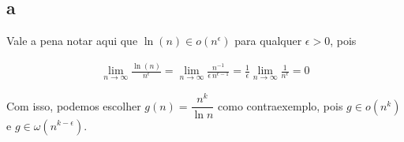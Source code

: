 \subsection{a}

Vale a pena notar aqui que $\ln(n) \in o\left(n^\epsilon\right)$ para qualquer $\epsilon > 0$, pois

\begin{align*}
    \lim_{n \to \infty} \frac{\ln(n)}{n^\epsilon} = \lim_{n \to \infty} \frac{n^{-1}}{\epsilon\, n^{\epsilon - 1}} = \frac{1}{\epsilon} \lim_{n \to \infty} \frac{1}{n^\epsilon} = 0
\end{align*}

Com isso, podemos escolher $g(n) = \dfrac{n^k}{\ln n}$ como contraexemplo, pois $g \in o\left(n^k\right)$ e $g \in \omega\left(n^{k-\epsilon}\right)$.

\skipline
\itemsep

